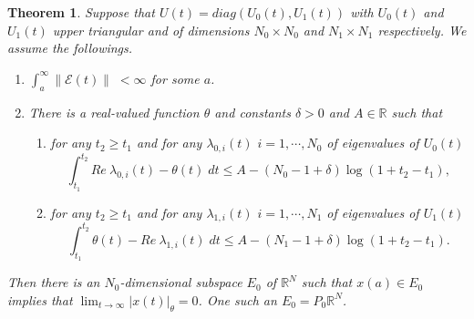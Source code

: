 \documentclass[a4paper,11pt]{article}
\newcommand{\upl}{\overline{\lambda}}
\newcommand{\udl}{\underline{\lambda}}
\newcommand{\E}{\mathcal{E}}
\newcounter{Theorem}
\newtheorem{theorem}[Theorem]{Theorem}
\theoremstyle{remark}
\begin{document}
\begin{theorem} Suppose that $U(t)=diag(U_0(t),U_1(t))$ with $U_0(t)$ and $U_1(t)$ upper triangular and of dimensions $N_0\times N_0$ and $N_1 \times N_1$ respectively. We assume the followings.%
\begin{enumerate}
 \item $\int_a^\infty \|\E(t)\| \; < \infty$ for some $a$.
 \item There is a real-valued function $\theta$ and constants $\delta >0$ and $A\in \mathbb{R}$ such that
 \begin{enumerate}
  \item for any $t_2\ge t_1$ and for any $\lambda_{0,i}(t)$ $i=1,\cdots,N_0$ of eigenvalues of $U_0(t)$ 
  $$ \int_{t_1}^{t_2} Re\: \lambda_{0,i}(t) - \theta(t) \; dt \le A -(N_0 -1 +\delta)\log(1+t_2-t_1),$$
 \item for any $t_2\ge t_1$ and for any $\lambda_{1,i}(t)$ $i=1,\cdots,N_1$ of eigenvalues of $U_1(t)$
  $$ \int_{t_1}^{t_2} \theta(t)- Re\: \lambda_{1,i}(t) \; dt \le A -(N_1 -1 +\delta)\log(1+t_2-t_1).$$
 \end{enumerate}
\end{enumerate}
Then there is an $N_0$-dimensional subspace $E_0$ of  $ \mathbb{R}^N$  such that $x(a)\in E_0$ implies that $\displaystyle \lim_{t \rightarrow \infty}|x(t)|_\theta =0$. One such an $E_0 = P_0\mathbb{R}^N$.
\end{theorem}
\end{document}
